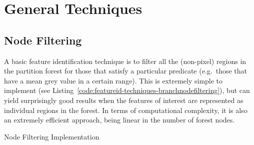 \section{General Techniques}
\label{sec:featureid-techniques}


\subsection{Node Filtering}


A basic feature identification technique is to filter all the (non-pixel) regions in the partition forest for those that satisfy a particular predicate (e.g.~those that have a mean grey value in a certain range). This is extremely simple to implement (see Listing~\ref{code:featureid-techniques-branchnodefiltering}), but can yield surprisingly good results when the features of interest are represented as individual regions in the forest. In terms of computational complexity, it is also an extremely efficient approach, being linear in the number of forest nodes.

\begin{stulisting}[p]
\caption{Node Filtering Implementation}
\label{code:featureid-techniques-branchnodefiltering}

\end{stulisting}

